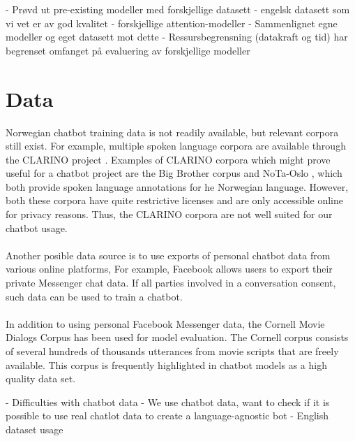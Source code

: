 \documentclass{article}
\begin{document}
\if
 - Prøvd ut pre-existing modeller med forskjellige datasett
    - engelsk datasett som vi vet er av god kvalitet
    - forskjellige attention-modeller
 - Sammenlignet egne modeller og eget datasett mot dette
 - Ressursbegrensning (datakraft og tid) har begrenset omfanget på evaluering
 av forskjellige modeller
\fi

\section{Data}

Norwegian chatbot training data is not readily available, but relevant corpora
still exist.  For example, multiple spoken language corpora are available
through the CLARINO project \cite{clarino-about}. Examples of CLARINO
corpora which might prove useful for a chatbot project are the Big Brother
corpus \cite{clarino-bb} and NoTa-Oslo \cite{clarino-nota}, which both provide
spoken language annotations for he Norwegian language. However, both these
corpora have quite restrictive licenses and are only accessible online for
privacy reasons. Thus, the CLARINO corpora are not well suited for our chatbot
usage.

\paragraph{}
Another posible data source is to use exports of personal chatbot data from
various online platforms, For example, Facebook allows users to export their
private Messenger chat data. If all parties involved in a conversation consent,
such data can be used to train a chatbot.


\paragraph{}
In addition to using personal Facebook Messenger data, the Cornell Movie
Dialogs Corpus \cite{cornell-corpus} has been used for model evaluation. The
Cornell corpus consists of several hundreds of thousands utterances from movie
scripts that are freely available. This corpus is frequently highlighted in
chatbot models as a high quality data set.

\if
- Difficulties with chatbot data 
- We use chatbot data, want to check if it is possible to use real chatlot data
to create a language-agnostic bot 
- English dataset usage
\fi
\end{document}
